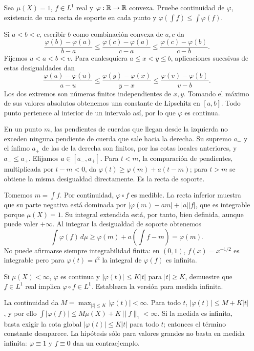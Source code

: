 \begin{ejercicio}\label{ej:v2-l17-5}
Sea $\mu(X)=1$, $f\in L^1$ real y $\varphi:\mathbb R\to\mathbb R$ convexa. Pruebe continuidad de $\varphi$, existencia de una recta de soporte en cada punto y $\varphi(\int f)\le\int\varphi(f)$.
\end{ejercicio}
\begin{solucion}
Si $a<b<c$, escribir $b$ como combinación convexa de $a,c$ da
\[\frac{\varphi(b)-\varphi(a)}{b-a}\le\frac{\varphi(c)-\varphi(a)}{c-a}\le\frac{\varphi(c)-\varphi(b)}{c-b}.
\]
Fijemos $u<a<b<v$. Para cualesquiera $a\le x<y\le b$, aplicaciones sucesivas de estas desigualdades dan
\[\frac{\varphi(a)-\varphi(u)}{a-u}\le\frac{\varphi(y)-\varphi(x)}{y-x}\le\frac{\varphi(v)-\varphi(b)}{v-b}.
\]
Los dos extremos son números finitos independientes de $x,y$. Tomando el máximo de sus valores absolutos obtenemos una constante de Lipschitz en $[a,b]$. Todo punto pertenece al interior de un intervalo así, por lo que $\varphi$ es continua.

En un punto $m$, las pendientes de cuerdas que llegan desde la izquierda no exceden ninguna pendiente de cuerda que sale hacia la derecha. Su supremo $a_-$ y el ínfimo $a_+$ de las de la derecha son finitos, por las cotas locales anteriores, y $a_-\le a_+$. Elijamos $a\in[a_-,a_+]$. Para $t<m$, la comparación de pendientes, multiplicada por $t-m<0$, da $\varphi(t)\ge\varphi(m)+a(t-m)$; para $t>m$ se obtiene la misma desigualdad directamente. Es la recta de soporte.

Tomemos $m=\int f$. Por continuidad, $\varphi\circ f$ es medible. La recta inferior muestra que su parte negativa está dominada por $|\varphi(m)-am|+|a||f|$, que es integrable porque $\mu(X)=1$. Su integral extendida está, por tanto, bien definida, aunque puede valer $+\infty$. Al integrar la desigualdad de soporte obtenemos
\[\int\varphi(f)\,d\mu\ge\varphi(m)+a\left(\int f-m\right)=\varphi(m).
\]
No puede afirmarse siempre integrabilidad finita: en $(0,1)$, $f(x)=x^{-1/2}$ es integrable pero para $\varphi(t)=t^2$ la integral de $\varphi(f)$ es infinita.
\end{solucion}

\begin{ejercicio}\label{ej:v2-l17-6}
Si $\mu(X)<\infty$, $\varphi$ es continua y $|\varphi(t)|\le K|t|$ para $|t|\ge K$, demuestre que $f\in L^1$ real implica $\varphi\circ f\in L^1$. Establezca la versión para medida infinita.
\end{ejercicio}
\begin{solucion}
La continuidad da $M=\max_{|t|\le K}|\varphi(t)|<\infty$. Para todo $t$, $|\varphi(t)|\le M+K|t|$, y por ello $\int|\varphi(f)|\le M\mu(X)+K\|f\|_1<\infty$. Si la medida es infinita, basta exigir la cota global $|\varphi(t)|\le K|t|$ para todo $t$; entonces el término constante desaparece. La hipótesis sólo para valores grandes no basta en medida infinita: $\varphi\equiv1$ y $f\equiv0$ dan un contraejemplo.
\end{solucion}

